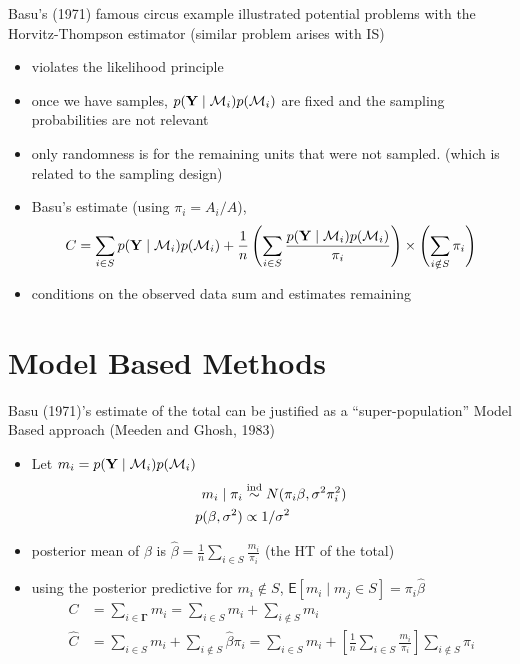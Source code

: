 \documentclass[
]{report}
\newcommand{\E}{\textsf{E}}
\newcommand{\1}{\mathbf{1}_n}
\newcommand{\ind}{\mathrel{\mathop{\sim}\limits^{\rm ind}}}
\newcommand{\Y}{\mathbf{Y}}
\def\M{{{\cal M}}}
\def\G{\boldsymbol{\Gamma}}
\begin{document}
Basu's (1971) famous circus example illustrated potential problems with
the Horvitz-Thompson estimator (similar problem arises with IS)

\begin{itemize}
\item
  violates the likelihood principle
\item
  once we have samples, \(p(\Y \mid \M_i) p(\M_i)\) are fixed and the
  sampling probabilities are not relevant
\item
  only randomness is for the remaining units that were not sampled.
  (which is related to the sampling design)
\item
  Basu's estimate (using \(\pi_i = A_i/A\)),
  \[C = \sum_{i \in S} p(\Y \mid \M_i) p(\M_i) + \frac{1}{n} \left(  \sum_{i \in S} \frac{p(\Y \mid \M_i)p(\M_i)}{\pi_i} \right) \times \left(\sum_{i \notin S} \pi_i \right)\]
\item
  conditions on the observed data sum and estimates remaining
\end{itemize}

\section{Model Based Methods}\label{model-based-methods}

Basu (1971)'s estimate of the total can be justified as a
``super-population'' Model Based approach (Meeden and Ghosh, 1983)

\begin{itemize}
\item
  Let \(m_i = p(\Y \mid \M_i) p(\M_i)\) \begin{align} 
  m_i  \mid \pi_i &\ind N(\pi_i \beta, \sigma^2 \pi_i^2) \\
  p(\beta, \sigma^2) & \propto 1/\sigma^2
  \end{align}
\item
  posterior mean of \(\beta\) is
  \(\hat{\beta} = \frac{1}{n} \sum_{i \in S} \frac{m_i}{\pi_i}\) (the HT
  of the total)
\item
  using the posterior predictive for \(m_i \notin S\),
  \(\E[m_i \mid m_j \in S] = \pi_i \hat{\beta}\) \begin{align*}
  C & = \sum_{i \in \G} m_i =  \sum_{i \in S} m_i + \sum_{i \notin S} m_i \\
  \hat{C} & = \sum_{i \in S} m_i + \sum_{i \notin S} \hat{\beta} \pi_i 
   = \sum_{i \in S} m_i +  \left[\frac{1}{n} \sum_{i \in S} \frac{m_i}{\pi_i} \right] \sum_{i \notin S} \pi_i 
  \end{align*}
\end{itemize}
\end{document}
